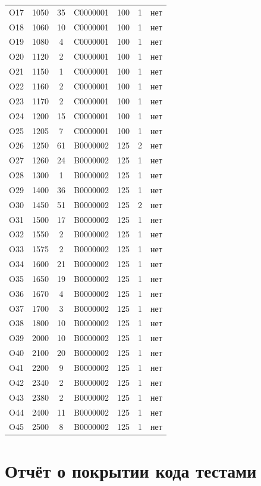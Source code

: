 \begin{longtable}{|c|c|c|c|c|c|c|}
O17 & 1050 & 35 & C0000001 & 100 & 1 & нет \\
O18 & 1060 & 10 & C0000001 & 100 & 1 & нет \\
O19 & 1080 & 4 & C0000001 & 100 & 1 & нет \\
O20 & 1120 & 2 & C0000001 & 100 & 1 & нет \\
O21 & 1150 & 1 & C0000001 & 100 & 1 & нет \\
O22 & 1160 & 2 & C0000001 & 100 & 1 & нет \\
O23 & 1170 & 2 & C0000001 & 100 & 1 & нет \\
O24 & 1200 & 15 & C0000001 & 100 & 1 & нет \\
O25 & 1205 & 7 & C0000001 & 100 & 1 & нет \\
O26 & 1250 & 61 & B0000002 & 125 & 2 & нет \\
O27 & 1260 & 24 & B0000002 & 125 & 1 & нет \\
O28 & 1300 & 1 & B0000002 & 125 & 1 & нет \\
O29 & 1400 & 36 & B0000002 & 125 & 1 & нет \\
O30 & 1450 & 51 & B0000002 & 125 & 2 & нет \\
O31 & 1500 & 17 & B0000002 & 125 & 1 & нет \\
O32 & 1550 & 2 & B0000002 & 125 & 1 & нет \\
O33 & 1575 & 2 & B0000002 & 125 & 1 & нет \\
O34 & 1600 & 21 & B0000002 & 125 & 1 & нет \\
O35 & 1650 & 19 & B0000002 & 125 & 1 & нет \\
O36 & 1670 & 4 & B0000002 & 125 & 1 & нет \\
O37 & 1700 & 3 & B0000002 & 125 & 1 & нет \\
O38 & 1800 & 10 & B0000002 & 125 & 1 & нет \\
O39 & 2000 & 10 & B0000002 & 125 & 1 & нет \\
O40 & 2100 & 20 & B0000002 & 125 & 1 & нет \\
O41 & 2200 & 9 & B0000002 & 125 & 1 & нет \\
O42 & 2340 & 2 & B0000002 & 125 & 1 & нет \\
O43 & 2380 & 2 & B0000002 & 125 & 1 & нет \\
O44 & 2400 & 11 & B0000002 & 125 & 1 & нет \\
O45 & 2500 & 8 & B0000002 & 125 & 1 & нет \\
\end{longtable}


 \chapter{Отчёт о покрытии кода тестами}
 \label{app:coverage-report}

